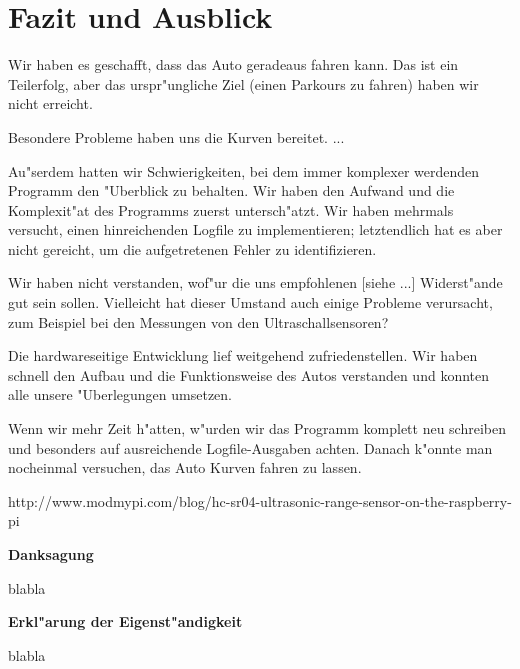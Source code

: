 \documentclass[a4paper,12pt]{article}
\begin{document}
\section{Fazit und Ausblick}\label{sec3}

Wir haben es geschafft, dass das Auto geradeaus fahren kann.
Das ist ein Teilerfolg, aber das urspr"ungliche Ziel (einen Parkours zu fahren) haben wir nicht erreicht.

Besondere Probleme haben uns die Kurven bereitet. ...

Au"serdem hatten wir Schwierigkeiten, bei dem immer komplexer werdenden Programm den "Uberblick zu behalten.
Wir haben den Aufwand und die Komplexit"at des Programms zuerst untersch"atzt.
Wir haben mehrmals versucht, einen hinreichenden Logfile zu implementieren; letztendlich hat es aber nicht gereicht, um die aufgetretenen Fehler zu identifizieren.

Wir haben nicht verstanden, wof"ur die uns empfohlenen [siehe ...] Widerst"ande gut sein sollen.
Vielleicht hat dieser Umstand auch einige Probleme verursacht, zum Beispiel bei den Messungen von den Ultraschallsensoren?

Die hardwareseitige Entwicklung lief weitgehend zufriedenstellen.
Wir haben schnell den Aufbau und die Funktionsweise des Autos verstanden und konnten alle unsere "Uberlegungen umsetzen.

Wenn wir mehr Zeit h"atten, w"urden wir das Programm komplett neu schreiben und besonders auf ausreichende Logfile-Ausgaben achten.
Danach k"onnte man nocheinmal versuchen, das Auto Kurven fahren zu lassen.

\bigskip


\begin{thebibliography}{99}
	\itemsep-2pt \small
	 http://www.modmypi.com/blog/hc-sr04-ultrasonic-range-sensor-on-the-raspberry-pi
\end{thebibliography}

\newpage


{\large\bf Danksagung}

\medskip

blabla

\bigskip


{\large\bf Erkl"arung der Eigenst"andigkeit}

\medskip

blabla
\end{document}

